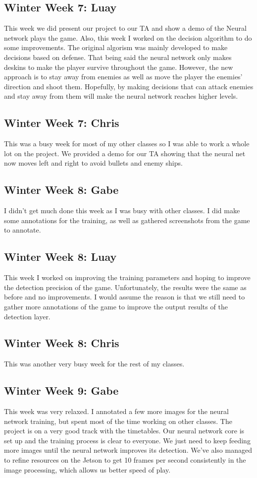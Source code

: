 \documentclass[onecolumn, draftclsnofoot,10pt, compsoc]{IEEEtran}
\begin{document}
\subsection{Winter Week 7: Luay}
This week we did present our project to our TA and show a demo of the Neural network plays the game. Also, this week I worked on the decision algorithm to do some improvements. The original algorism was mainly developed to make decisions based on defense. That being said the neural network only makes deskins to make the player survive throughout the game. However, the new approach is to stay away from enemies as well as move the player the enemies’ direction and shoot them. Hopefully, by making decisions that can attack enemies and stay away from them will make the neural network reaches higher levels.
\subsection{Winter Week 7: Chris}
This was a busy week for most of my other classes so I was able to work a whole lot on the project. We provided a demo for our TA showing that the neural net now moves left and right to avoid bullets and enemy ships.
\subsection{Winter Week 8: Gabe}
I didn't get much done this week as I was busy with other classes. I did make some annotations for the training, as well as gathered screenshots from the game to annotate.
\subsection{Winter Week 8: Luay}
This week I worked on improving the training parameters and hoping to improve the detection precision of the game. Unfortunately, the results were the same as before and no improvements. I would assume the reason is that we still need to gather more annotations of the game to improve the output results of the detection layer.
\subsection{Winter Week 8: Chris}
This was another very busy week for the rest of my classes.
\subsection{Winter Week 9: Gabe}
This week was very relaxed. I annotated a few more images for the neural network training, but spent most of the time working on other classes. The project is on a very good track with the timetables. Our neural network core is set up and the training process is clear to everyone. We just need to keep feeding more images until the neural network improves its detection. We've also managed to refine resources on the Jetson to get 10 frames per second consistently in the image processing, which allows us better speed of play.
\end{document}
